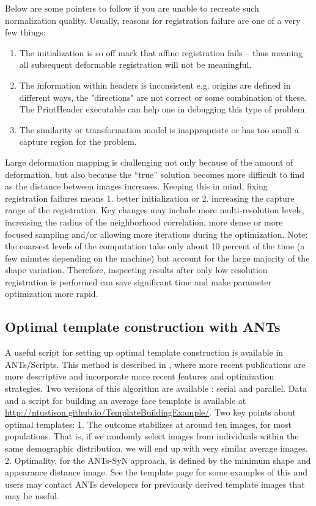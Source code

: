 \documentclass{InsightArticle}
\begin{document}
Below are some pointers to follow if you are unable to recreate such normalization quality.  
Usually, reasons for registration failure are one of a very few things: 
\begin{enumerate}
\item The initialization is so off mark that affine registration fails -- thus meaning all subsequent deformable registration will not be meaningful.
\item The information within headers is inconsistent e.g. origins are defined in different ways, the "directions" are not correct or some combination of these.    The PrintHeader executable can help one in debugging this type of problem.  
\item  The similarity or transformation model is inappropriate or has too small a capture region for the problem. 
\end{enumerate}

Large deformation mapping is challenging not only because of the
amount of deformation, but also because the ``true'' solution becomes
more difficult to find as the distance between images increases.
Keeping this in mind, fixing registration failures means 1. better
initialization or 2. increasing the capture range of the registration. 
Key changes may include more multi-resolution levels, increasing the radius of the neighborhood
correlation, more dense or more focused sampling and/or 
allowing more iterations during the optimization.  
Note: the coarsest levels of the computation take only about
10 percent of the time (a few minutes depending on the machine)
but account for the large majority of the shape variation.  Therefore,
inspecting results after only low resolution registration is performed
can save significant time and make parameter optimization more rapid.

\subsection{Optimal template construction with ANTs}
A useful script for setting up optimal template construction
 is available in ANTs/Scripts.  This method is described in \cite{Avants2004,Avants2006d,Kim2008,Yushkevich2009,Avants2009c}, 
where more recent publications are more descriptive and incorporate 
more recent features and optimization strategies. 
Two versions of this algorithm are available : serial and parallel.  
Data and a script for building an average face template is available 
at \href{http://ntustison.github.io/TemplateBuildingExample/}{http://ntustison.github.io/TemplateBuildingExample/}.  Two key points about optimal templates:
1. The outcome stabilizes at around ten images, for most populations.
That is, if we randomly select images from individuals within the same 
demographic distribution, we will end up with very similar average images.  
2.  Optimality, for the ANTs-SyN approach, is defined by the minimum shape 
and appearance distance image. 
See the template page for some examples of this and users may 
contact ANTs developers for previously derived template 
images that may be useful. 
\end{document}
